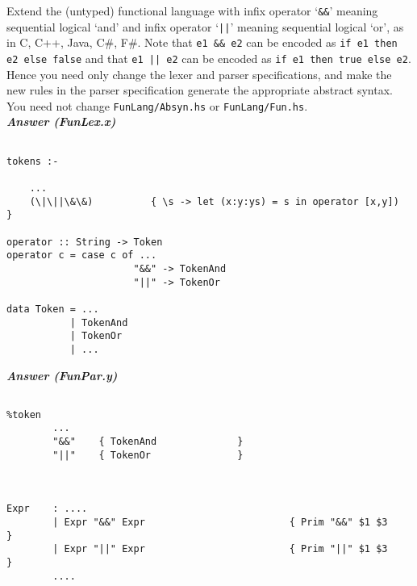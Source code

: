 \documentclass[a4paper]{article}
\begin{document}
\begin{exercise}\label{exer-fun-sequential-logical}
  Extend the (untyped) functional language with infix operator
  `\verb|&&|' meaning sequential logical `and' and infix operator
  `\verb+||+' meaning sequential logical `or', as in C, C++, Java,
  C\#, F\#\@.  Note that \verb+e1 && e2+ can be encoded as \texttt{if
    e1 then e2 else false} and that \verb+e1 || e2+ can be encoded as
  \texttt{if e1 then true else e2}.  Hence you need only change the
  lexer and parser specifications, and make the new rules in the
  parser specification generate the appropriate abstract syntax.  You
  need not change \texttt{FunLang/Absyn.hs} or \texttt{FunLang/Fun.hs}\@.\\
  
  
\noindent
\textbf{\emph{Answer (FunLex.x)}} 
{\codesetup\begin{verbatim}

tokens :-

    ...
    (\|\||\&\&)          { \s -> let (x:y:ys) = s in operator [x,y])  }

operator :: String -> Token
operator c = case c of ... 
                      "&&" -> TokenAnd
                      "||" -> TokenOr
                      
data Token = ...
           | TokenAnd
           | TokenOr
           | ...
\end{verbatim}}

\noindent
\textbf{\emph{Answer (FunPar.y)}} 
{\codesetup\begin{verbatim}

%token  
        ...    
        "&&"    { TokenAnd              }
        "||"    { TokenOr               }



Expr    : ....
        | Expr "&&" Expr                         { Prim "&&" $1 $3        }
        | Expr "||" Expr                         { Prim "||" $1 $3        }
        ....
\end{verbatim}}

\end{exercise}
\end{document}
